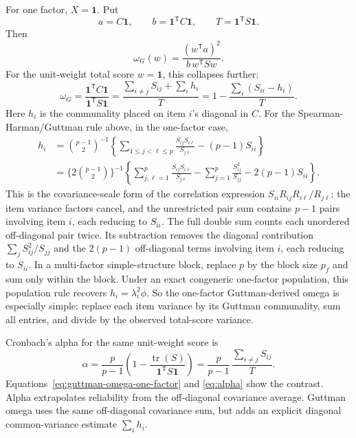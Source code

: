 \documentclass[11pt]{article}
\newcommand{\T}{^{\mathsf T}}
\newcommand{\tr}{\operatorname{tr}}
\theoremstyle{plain}
\theoremstyle{remark}
\begin{document}
For one factor, \(X=\mathbf{1}\). Put
\[
  a=C\mathbf{1},\qquad b=\mathbf{1}\T C\mathbf{1},\qquad
  T=\mathbf{1}\T S\mathbf{1}.
\]
Then
\[
  \omega_G(w)=\frac{(w\T a)^2}{b\,w\T S w}.
\]
For the unit-weight total score \(w=\mathbf{1}\), this collapses further:
\begin{equation}\label{eq:guttman-omega-one-factor}
  \omega_G
    =
  \frac{\mathbf{1}\T C\mathbf{1}}{\mathbf{1}\T S\mathbf{1}}
    =
  \frac{\sum_{i\ne j}S_{ij}+\sum_i h_i}{T}
    =
  1-\frac{\sum_i(S_{ii}-h_i)}{T}.
\end{equation}
Here \(h_i\) is the communality placed on item \(i\)'s diagonal in \(C\). For
the Spearman-Harman/Guttman rule above, in the one-factor case,
\[
  \begin{aligned}
  h_i
    &=
  {\binom{p-1}{2}}^{-1}
  \left\{
    \sum_{1\le j<\ell\le p}
      \frac{S_{ij}S_{i\ell}}{S_{j\ell}}
    -(p-1)S_{ii}
  \right\} \\
    &=
  \{2\binom{p-1}{2}\}^{-1}
  \left\{
    \sum_{j,\ell=1}^{p}
      \frac{S_{ij}S_{i\ell}}{S_{j\ell}}
    -\sum_{j=1}^{p}\frac{S_{ij}^2}{S_{jj}}
    -2(p-1)S_{ii}
  \right\}.
  \end{aligned}
\]
This is the covariance-scale form of the correlation expression
\(S_{ii}R_{ij}R_{i\ell}/R_{j\ell}\): the item variance factors cancel, and the
unrestricted pair sum contains \(p-1\) pairs involving item \(i\), each reducing
to \(S_{ii}\). The full double sum counts each unordered off-diagonal pair
twice. Its subtraction removes the diagonal contribution
\(\sum_jS_{ij}^2/S_{jj}\) and the \(2(p-1)\) off-diagonal terms involving item
\(i\), each reducing to \(S_{ii}\). In a multi-factor simple-structure block,
replace \(p\) by the block size \(p_f\) and sum only within the block. Under an
exact congeneric one-factor population, this population rule recovers
\(h_i=\lambda_i^2\phi\).
So the one-factor Guttman-derived omega is especially simple: replace each
item variance by its Guttman communality, sum all entries, and divide by the
observed total-score variance.

Cronbach's alpha for the same unit-weight score is
\cite{cronbach1951}
\begin{equation}\label{eq:alpha}
  \alpha
    =
  \frac{p}{p-1}
  \left(
    1-\frac{\tr(S)}{\mathbf{1}\T S\mathbf{1}}
  \right)
    =
  \frac{p}{p-1}\,
  \frac{\sum_{i\ne j}S_{ij}}{T}.
\end{equation}
Equations~\eqref{eq:guttman-omega-one-factor} and \eqref{eq:alpha} show the
contrast. Alpha extrapolates reliability from the off-diagonal covariance
average. Guttman omega uses the same off-diagonal covariance sum, but adds an
explicit diagonal common-variance estimate \(\sum_i h_i\).
\end{document}
